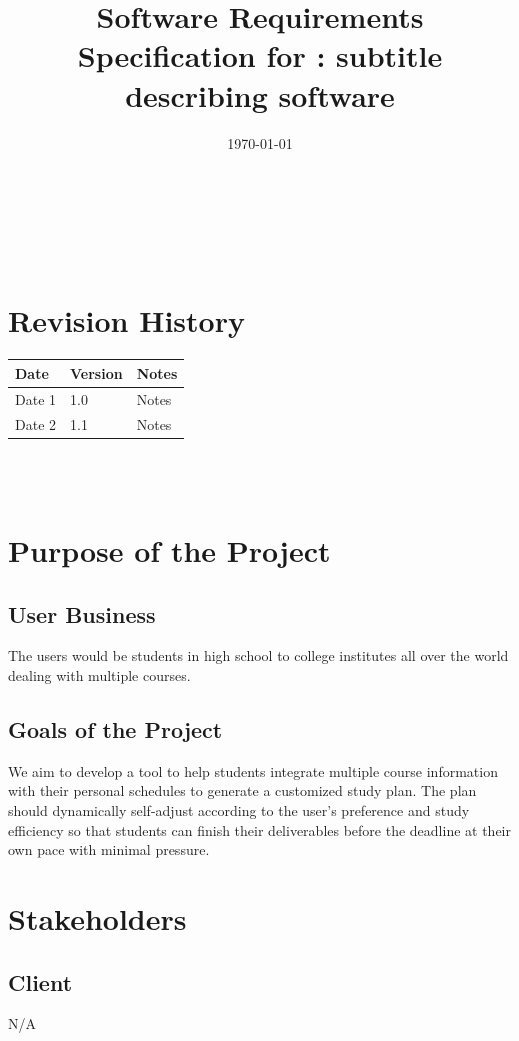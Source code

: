 \documentclass[12pt]{article}
\begin{document}
\title{Software Requirements Specification for \progname: subtitle describing software} 
\author{\authname}
\date{\today}
	
\maketitle
~\newpage


\tableofcontents

~\newpage

\section*{Revision History}

\begin{tabularx}{\textwidth}{p{3cm}p{2cm}X}
\toprule {\textbf{Date}} & {\textbf{Version}} & {\textbf{Notes}}\\
\midrule
Date 1 & 1.0 & Notes\\
Date 2 & 1.1 & Notes\\
\bottomrule
\end{tabularx}

~\\

~\newpage
\section{Purpose of the Project}
\subsection{User Business}
The users would be students in high school to college institutes all over the world dealing with multiple courses.
\subsection{Goals of the Project}
We aim to develop a tool to help students integrate multiple course information with their personal schedules to generate a customized study plan. The plan should dynamically self-adjust according to the user's preference and study efficiency so that students can finish their deliverables before the deadline at their own pace with minimal pressure.
\section{Stakeholders}
\subsection{Client}
N/A
\end{document}
